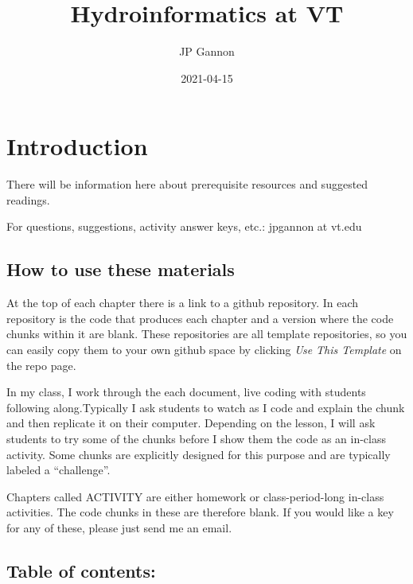 \documentclass[
]{book}
\title{Hydroinformatics at VT}
\author{JP Gannon}
\date{2021-04-15}
\begin{document}
\maketitle

{
\setcounter{tocdepth}{1}
\tableofcontents
}
\hypertarget{introduction}{%
\chapter{Introduction}\label{introduction}}

There will be information here about prerequisite resources and suggested readings.

For questions, suggestions, activity answer keys, etc.: jpgannon at vt.edu

\hypertarget{how-to-use-these-materials}{%
\section{How to use these materials}\label{how-to-use-these-materials}}

At the top of each chapter there is a link to a github repository. In each repository is the code that produces each chapter and a version where the code chunks within it are blank. These repositories are all template repositories, so you can easily copy them to your own github space by clicking \emph{Use This Template} on the repo page.

In my class, I work through the each document, live coding with students following along.Typically I ask students to watch as I code and explain the chunk and then replicate it on their computer. Depending on the lesson, I will ask students to try some of the chunks before I show them the code as an in-class activity. Some chunks are explicitly designed for this purpose and are typically labeled a ``challenge''.

Chapters called ACTIVITY are either homework or class-period-long in-class activities. The code chunks in these are therefore blank. If you would like a key for any of these, please just send me an email.

\hypertarget{table-of-contents}{%
\section{Table of contents:}\label{table-of-contents}}
\end{document}
